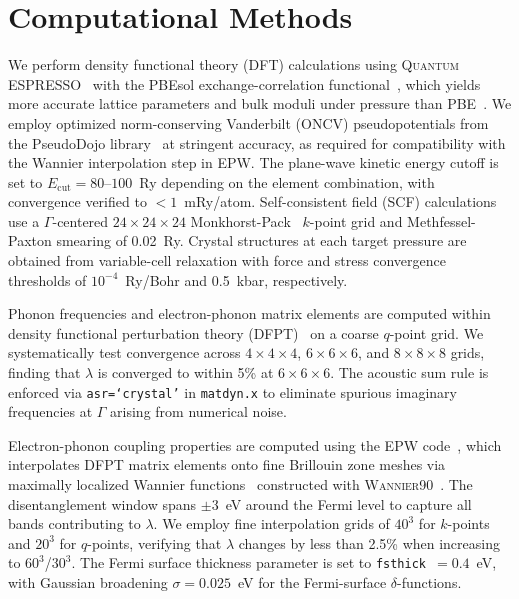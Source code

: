 \section{Computational Methods}
\label{sec:methods}


We perform density functional theory (DFT) calculations using
\textsc{Quantum ESPRESSO}~\cite{QE2020} with the PBEsol
exchange-correlation functional~\cite{PBEsol2008}, which yields more
accurate lattice parameters and bulk moduli under pressure than
PBE~\cite{Csonka2009}. We employ optimized norm-conserving Vanderbilt
(ONCV) pseudopotentials from the PseudoDojo library~\cite{PseudoDojo2018}
at stringent accuracy, as required for compatibility with the Wannier
interpolation step in EPW. The plane-wave kinetic energy cutoff is set
to $E_{\mathrm{cut}} = 80\text{--}100$~Ry depending on the element
combination, with convergence verified to $< 1$~mRy/atom.
Self-consistent field (SCF) calculations use a $\Gamma$-centered
$24 \times 24 \times 24$ Monkhorst-Pack~\cite{MonkhorstPack1976}
$k$-point grid and Methfessel-Paxton smearing of 0.02~Ry. Crystal
structures at each target pressure are obtained from variable-cell
relaxation with force and stress convergence thresholds of
$10^{-4}$~Ry/Bohr and 0.5~kbar, respectively.

Phonon frequencies and electron-phonon matrix elements are computed
within density functional perturbation theory
(DFPT)~\cite{Baroni2001} on a coarse $q$-point grid. We systematically
test convergence across $4 \times 4 \times 4$, $6 \times 6 \times 6$,
and $8 \times 8 \times 8$ grids, finding that $\lambda$ is converged
to within 5\% at $6 \times 6 \times 6$. The acoustic sum rule is
enforced via \texttt{asr=`crystal'} in \texttt{matdyn.x} to eliminate
spurious imaginary frequencies at $\Gamma$ arising from numerical noise.

Electron-phonon coupling properties are computed using the EPW
code~\cite{Ponce2016,Ponce2023}, which interpolates DFPT matrix
elements onto fine Brillouin zone meshes via maximally localized
Wannier functions~\cite{Marzari1997} constructed with
\textsc{Wannier90}~\cite{Wannier90}. The disentanglement window
spans $\pm 3$~eV around the Fermi level to capture all bands
contributing to $\lambda$. We employ fine interpolation grids of
$40^3$ for $k$-points and $20^3$ for $q$-points, verifying that
$\lambda$ changes by less than 2.5\% when increasing to $60^3$/$30^3$.
The Fermi surface thickness parameter is set to
\texttt{fsthick}~$= 0.4$~eV, with Gaussian broadening
$\sigma = 0.025$~eV for the Fermi-surface $\delta$-functions.

